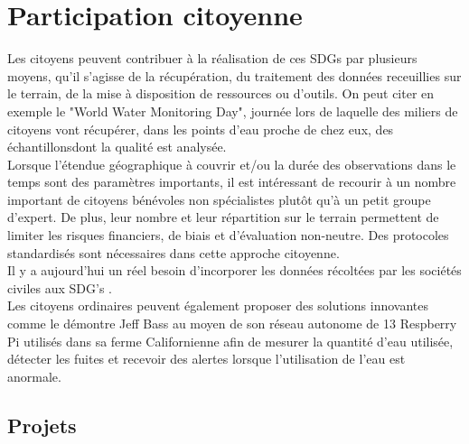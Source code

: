 \documentclass[10pt, article]{llncs}
\begin{document}
\section{Participation citoyenne}
	Les citoyens peuvent contribuer à la réalisation de ces SDGs par plusieurs moyens, qu'il s'agisse de la récupération, du traitement des données receuillies sur le terrain, de la mise à disposition de ressources ou d'outils. On peut citer en exemple le "World Water Monitoring Day", journée lors de laquelle des miliers de citoyens vont récupérer, dans les points d'eau proche de chez eux, des échantillonsdont la qualité est analysée. \\
	Lorsque l'étendue géographique à couvrir et/ou la durée des observations dans le temps sont des paramètres importants, il est intéressant de recourir à un nombre important de citoyens bénévoles non spécialistes plutôt qu'à un petit groupe d'expert. De plus, leur nombre et leur répartition sur le terrain permettent de limiter les risques financiers, de biais et d'évaluation non-neutre. Des protocoles standardisés sont nécessaires dans cette approche citoyenne.\\
	Il y a aujourd'hui un réel besoin d'incorporer les données récoltées par les sociétés civiles aux SDG's \cite{fluckiger_sustainable_2016}.\\
	Les citoyens ordinaires peuvent également proposer des solutions innovantes comme le démontre Jeff Bass au moyen de son réseau autonome de 13 Respberry Pi utilisés dans sa ferme Californienne afin de mesurer la quantité d'eau utilisée, détecter les fuites et recevoir des alertes lorsque l'utilisation de l'eau est anormale.

	\subsection{Projets}
\end{document}
